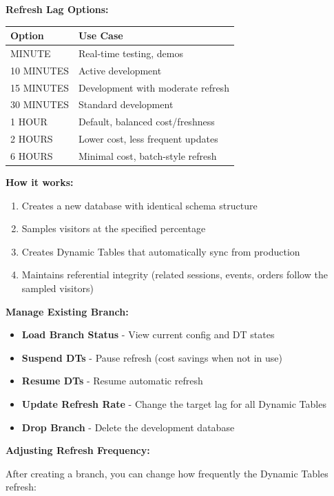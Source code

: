 \documentclass[
  letterpaper,
  DIV=11,
  numbers=noendperiod]{scrreprt}
\providecommand{\tightlist}{%
  \setlength{\itemsep}{0pt}\setlength{\parskip}{0pt}}\usepackage{longtable,booktabs,array}
\begin{document}
\textbf{Refresh Lag Options:}

\begin{longtable}[]{@{}ll@{}}
\toprule\noalign{}
Option & Use Case \\
\midrule\noalign{}
\endhead
\bottomrule\noalign{}
\endlastfoot
1 MINUTE & Real-time testing, demos \\
10 MINUTES & Active development \\
15 MINUTES & Development with moderate refresh \\
30 MINUTES & Standard development \\
1 HOUR & Default, balanced cost/freshness \\
2 HOURS & Lower cost, less frequent updates \\
6 HOURS & Minimal cost, batch-style refresh \\
\end{longtable}

\textbf{How it works:}

\begin{enumerate}
\def\labelenumi{\arabic{enumi}.}
\tightlist
\item
  Creates a new database with identical schema structure
\item
  Samples visitors at the specified percentage
\item
  Creates Dynamic Tables that automatically sync from production
\item
  Maintains referential integrity (related sessions, events, orders
  follow the sampled visitors)
\end{enumerate}

\textbf{Manage Existing Branch:}

\begin{itemize}
\tightlist
\item
  \textbf{Load Branch Status} - View current config and DT states
\item
  \textbf{Suspend DTs} - Pause refresh (cost savings when not in use)
\item
  \textbf{Resume DTs} - Resume automatic refresh
\item
  \textbf{Update Refresh Rate} - Change the target lag for all Dynamic
  Tables
\item
  \textbf{Drop Branch} - Delete the development database
\end{itemize}

\textbf{Adjusting Refresh Frequency:}

After creating a branch, you can change how frequently the Dynamic
Tables refresh:
\end{document}
